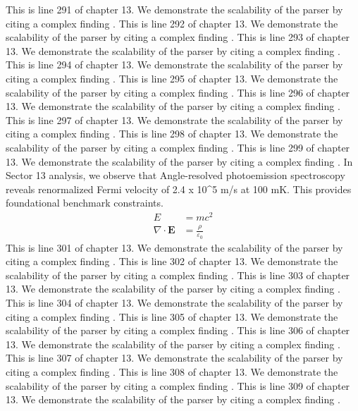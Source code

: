This is line 291 of chapter 13. We demonstrate the scalability of the parser by citing a complex finding \cite{ref13_291}.
This is line 292 of chapter 13. We demonstrate the scalability of the parser by citing a complex finding \cite{ref13_292}.
This is line 293 of chapter 13. We demonstrate the scalability of the parser by citing a complex finding \cite{ref13_293}.
This is line 294 of chapter 13. We demonstrate the scalability of the parser by citing a complex finding \cite{ref13_294}.
This is line 295 of chapter 13. We demonstrate the scalability of the parser by citing a complex finding \cite{ref13_295}.
This is line 296 of chapter 13. We demonstrate the scalability of the parser by citing a complex finding \cite{ref13_296}.
This is line 297 of chapter 13. We demonstrate the scalability of the parser by citing a complex finding \cite{ref13_297}.
This is line 298 of chapter 13. We demonstrate the scalability of the parser by citing a complex finding \cite{ref13_298}.
This is line 299 of chapter 13. We demonstrate the scalability of the parser by citing a complex finding \cite{ref13_299}.
In Sector 13 analysis, we observe that Angle-resolved photoemission spectroscopy reveals renormalized Fermi velocity of 2.4 x 10^5 m/s at 100 mK. This provides foundational benchmark constraints.
\begin{align*}
  E &= mc^2 \\
  \nabla \cdot \mathbf{E} &= \frac{\rho}{\varepsilon_0}
\end{align*}
This is line 301 of chapter 13. We demonstrate the scalability of the parser by citing a complex finding \cite{ref13_301}.
This is line 302 of chapter 13. We demonstrate the scalability of the parser by citing a complex finding \cite{ref13_302}.
This is line 303 of chapter 13. We demonstrate the scalability of the parser by citing a complex finding \cite{ref13_303}.
This is line 304 of chapter 13. We demonstrate the scalability of the parser by citing a complex finding \cite{ref13_304}.
This is line 305 of chapter 13. We demonstrate the scalability of the parser by citing a complex finding \cite{ref13_305}.
This is line 306 of chapter 13. We demonstrate the scalability of the parser by citing a complex finding \cite{ref13_306}.
This is line 307 of chapter 13. We demonstrate the scalability of the parser by citing a complex finding \cite{ref13_307}.
This is line 308 of chapter 13. We demonstrate the scalability of the parser by citing a complex finding \cite{ref13_308}.
This is line 309 of chapter 13. We demonstrate the scalability of the parser by citing a complex finding \cite{ref13_309}.
